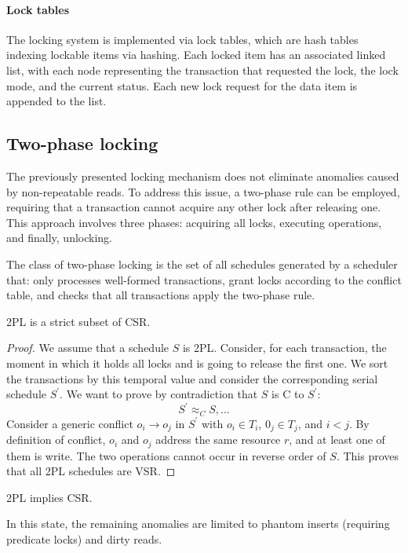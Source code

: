 \paragraph*{Lock tables}
The locking system is implemented via lock tables, which are hash tables indexing lockable items via hashing. 
Each locked item has an associated linked list, with each node representing the transaction that requested the lock, the lock mode, and the current status. 
Each new lock request for the data item is appended to the list.

\subsection{Two-phase locking}
The previously presented locking mechanism does not eliminate anomalies caused by non-repeatable reads. 
To address this issue, a two-phase rule can be employed, requiring that a transaction cannot acquire any other lock after releasing one. 
This approach involves three phases: acquiring all locks, executing operations, and finally, unlocking.
\begin{definition}
    The class of two-phase locking is the set of all schedules generated by a scheduler that: only processes well-formed transactions, grant locks according to the conflict table, and checks that all transactions apply the two-phase rule.             
\end{definition}
\begin{property}
    2PL is a strict subset of CSR. 
\end{property}
\begin{proof}
    We assume that a schedule $S$ is 2PL. Consider, for each transaction, the moment in which it holds all locks and is going to release the first one. 
    We sort the transactions by this temporal value and consider the corresponding serial schedule $S^{'}$. 
    We want to prove by contradiction that $S$ is C to $S^{'}$: 
    \[S^{'}\approx_CS,\dots\]
    Consider a generic conflict $o_i \rightarrow o_j$ in $S^{'}$ with $o_i \in T_i$, $0_j \in T_j$, and $i<j$. 
    By definition of conflict, $o_i$ and $o_j$ address the same resource $r$, and at least one of them is write. 
    The two operations cannot occur in reverse order of $S$. 
    This proves that all 2PL schedules are VSR. 
\end{proof}
\begin{property}
    2PL implies CSR.
\end{property}
In this state, the remaining anomalies are limited to phantom inserts (requiring predicate locks) and dirty reads.

